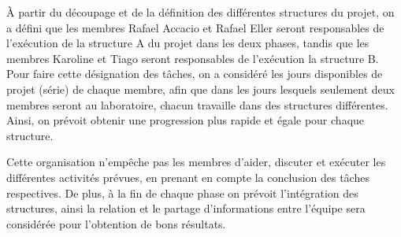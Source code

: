 
À partir du découpage et de la définition des différentes structures du projet, on a défini que les membres Rafael Accacio et Rafael Eller seront responsables de l'exécution de la structure A du projet dans les deux phases, tandis que les membres Karoline et Tiago seront responsables de l'exécution la structure B. Pour faire cette désignation des tâches, on a considéré les jours disponibles de projet (série) de chaque membre, afin que dans les jours lesquels seulement deux membres seront au laboratoire, chacun travaille dans des structures différentes. Ainsi, on prévoit obtenir une progression plus rapide et égale pour chaque structure.  

Cette organisation n’empêche pas les membres d’aider, discuter et exécuter les différentes activités prévues, en prenant en compte la conclusion des tâches respectives. De plus, à la fin de chaque phase on prévoit l’intégration des structures, ainsi la relation et le partage d’informations entre l’équipe sera considérée pour l’obtention de bons résultats.
